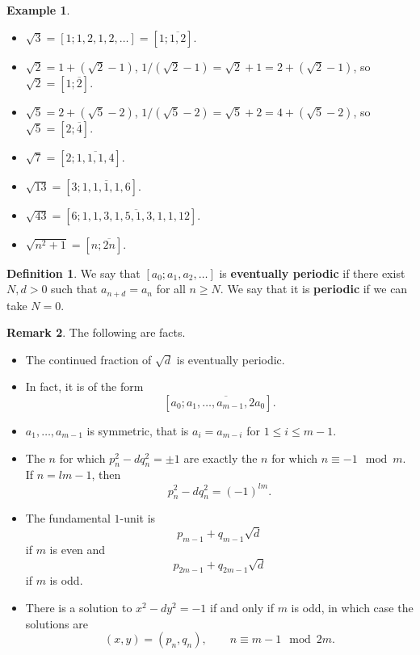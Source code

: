 \documentclass{article}
\newcommand{\rb}[1]{\left( #1 \right)}
\renewcommand{\sb}[1]{\left[ #1 \right]}
\theoremstyle{definition}\newtheorem{definition}{Definition}
\theoremstyle{definition}\newtheorem{remark}[definition]{Remark}
\theoremstyle{definition}\newtheorem*{example}{Example}
\theoremstyle{definition}\newtheorem*{note}{Note}
\begin{document}
\begin{example}
\hfill
\begin{itemize}
\item $ \sqrt{3} = \sb{1; 1, 2, 1, 2, \dots} = \sb{1; \overline{1, 2}} $.
\item $ \sqrt{2} = 1 + \rb{\sqrt{2} - 1} $, $ 1 / \rb{\sqrt{2} - 1} = \sqrt{2} + 1 = 2 + \rb{\sqrt{2} - 1} $, so $ \sqrt{2} = \sb{1; \overline{2}} $.
\item $ \sqrt{5} = 2 + \rb{\sqrt{5} - 2} $, $ 1 / \rb{\sqrt{5} - 2} = \sqrt{5} + 2 = 4 + \rb{\sqrt{5} - 2} $, so $ \sqrt{5} = \sb{2; \overline{4}} $.
\item $ \sqrt{7} = \sb{2; \overline{1, 1, 1, 4}} $.
\item $ \sqrt{13} = \sb{3; \overline{1, 1, 1, 1, 6}} $.
\item $ \sqrt{43} = \sb{6; \overline{1, 1, 3, 1, 5, 1, 3, 1, 1, 12}} $.
\item $ \sqrt{n^2 + 1} = \sb{n; \overline{2n}} $.
\end{itemize}
\end{example}

\begin{definition}
We say that $ \sb{a_0; a_1, a_2, \dots} $ is \textbf{eventually periodic} if there exist $ N, d > 0 $ such that $ a_{n + d} = a_n $ for all $ n \ge N $. We say that it is \textbf{periodic} if we can take $ N = 0 $.
\end{definition}

\begin{remark}
The following are facts.
\begin{itemize}
\item The continued fraction of $ \sqrt{d} $ is eventually periodic.
\item In fact, it is of the form
$$ \sb{a_0; \overline{a_1, \dots, a_{m - 1}, 2a_0}}. $$
\item $ a_1, \dots, a_{m - 1} $ is symmetric, that is $ a_i = a_{m - i} $ for $ 1 \le i \le m - 1 $.
\item The $ n $ for which $ p_n^2 - dq_n^2 = \pm 1 $ are exactly the $ n $ for which $ n \equiv -1 \mod m $. If $ n = lm - 1 $, then
$$ p_n^2 - dq_n^2 = \rb{-1}^{lm}. $$
\item The fundamental $ 1 $-unit is
$$ p_{m - 1} + q_{m - 1}\sqrt{d} $$
if $ m $ is even and
$$ p_{2m - 1} + q_{2m - 1}\sqrt{d} $$
if $ m $ is odd.
\item There is a solution to $ x^2 - dy^2 = -1 $ if and only if $ m $ is odd, in which case the solutions are
$$ \rb{x, y} = \rb{p_n, q_n}, \qquad n \equiv m - 1 \mod 2m. $$
\end{itemize}
\end{remark}
\end{document}
